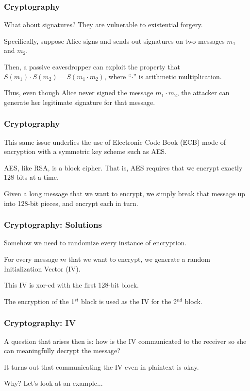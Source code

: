 \begin{frame}
\frametitle{Cryptography}
\begin{changemargin}{1cm}

What about signatures? They are vulnerable to \alert{existential forgery}.

Specifically, suppose Alice signs and sends out signatures on two messages
$m_1$ and $m_2$. 

Then, a passive eavesdropper can exploit the property that
$S(m_1) \cdot S(m_2) = S(m_1 \cdot m_2)$, where ``$\cdot$'' is arithmetic
multiplication.

Thus, even though Alice never signed the message $m_1 \cdot m_2$, the attacker
can generate her legitimate signature for that message. 

\end{changemargin}
\end{frame}

\begin{frame}
\frametitle{Cryptography}
\begin{changemargin}{1cm}

This same issue underlies the use of Electronic Code Book (ECB) mode of
encryption with a symmetric key scheme such as AES.

AES, like RSA, is a block cipher. That is, AES requires that we encrypt
exactly 128 bits at a time. 

Given a long message that we want
to encrypt, we simply break that message up into 128-bit pieces, and encrypt
each in turn. 

\end{changemargin}
\end{frame}

\begin{frame}
\frametitle{Cryptography: Solutions}
\begin{changemargin}{1cm}

Somehow we need to randomize every instance of encryption. 

For every message $m$ that we want to encrypt, we generate a random Initialization Vector (IV). 

This IV is xor-ed with the first 128-bit block. 

The encryption of the 1$^{st}$ block is used as the IV for the 2$^{nd}$ block.

\end{changemargin}
\end{frame}


\begin{frame}
\frametitle{Cryptography: IV}
\begin{changemargin}{1cm}

A question that arises then is: how is the IV communicated to the receiver so she
can meaningfully decrypt the message? 

It turns out that communicating the IV
even in plaintext is okay.

Why? Let's look at an example...

\end{changemargin}
\end{frame}

